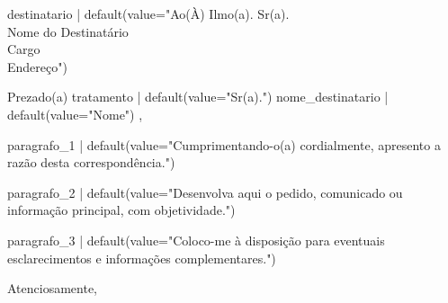 \documentclass[12pt,a4paper]{letter}
\begin{document}
\begin{letter}{ {{ destinatario | default(value="Ao(À) Ilmo(a). Sr(a).\\Nome do Destinatário\\Cargo\\Endereço") }} }

\opening{Prezado(a) {{ tratamento | default(value="Sr(a).") }} {{ nome_destinatario | default(value="Nome") }}, }

{{ paragrafo_1 | default(value="Cumprimentando-o(a) cordialmente, apresento a razão desta correspondência.") }}

{{ paragrafo_2 | default(value="Desenvolva aqui o pedido, comunicado ou informação principal, com objetividade.") }}

{{ paragrafo_3 | default(value="Coloco-me à disposição para eventuais esclarecimentos e informações complementares.") }}

\closing{Atenciosamente,}

\end{letter}
\end{document}
